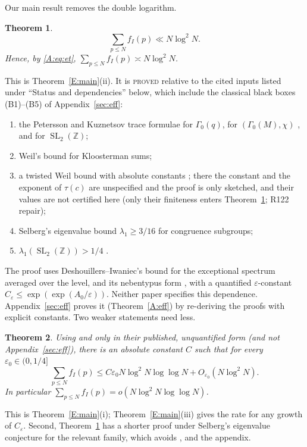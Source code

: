 \documentclass[10pt,reqno]{amsart}
\newtheorem{introthm}{Theorem}
\theoremstyle{definition}
\numberwithin{equation}{section}
\newcommand{\Z}{\mathbb Z}
\DeclareMathOperator{\SL}{SL}
\newcommand{\status}[1]{\textup{\textsc{#1}}}
\begin{document}
Our main result removes the double logarithm.
\begin{introthm}\label{thm:main}
\[
 \sum_{p\le N}f_I(p)\ll N\log^2N .
\]
Hence, by \eqref{A:eq:et}, $\sum_{p\le N}f_I(p)\asymp N\log^2N$.
\end{introthm}
This is Theorem~\ref{E:main}(ii). It is \status{proved} relative to the
cited inputs listed under ``Status and dependencies'' below, which include the
classical black boxes (B1)--(B5) of Appendix~\ref{sec:eff}:
\begin{enumerate}
\item[(B1)] the Petersson and Kuznetsov trace formulae for $\Gamma_0(q)$, for
$(\Gamma_0(M),\chi)$ \cite[Lemma~4.5]{Dr}, and for $\SL_2(\Z)$;
\item[(B2)] Weil's bound for Kloosterman sums;
\item[(B3)] a twisted Weil bound with absolute constants \cite[Lemma~4.2]{Dr}; there the
constant and the exponent of $\tau(c)$ are unspecified and the proof is only
sketched, and their values are not certified here (only their finiteness
enters Theorem~\ref{thm:main}; R122 repair);
\item[(B4)] Selberg's eigenvalue bound $\lambda_1\ge3/16$ for congruence subgroups;
\item[(B5)] $\lambda_1(\SL_2(\Z))>1/4$ \cite[Theorem~3]{DI}.
\end{enumerate}
The proof uses Deshouillers--Iwaniec's bound \cite[Theorem~7]{DI} for the
exceptional spectrum averaged over the level, and its nebentypus form
\cite[Lemma~4.10]{Dr}, with a quantified $\varepsilon$-constant
$C_\varepsilon\le\exp(\exp(A_0/\varepsilon))$. Neither paper specifies this dependence. Appendix~\ref{sec:eff}
proves it (Theorem~\ref{A:eff}) by re-deriving the proofs with explicit constants.
Two weaker statements need less.
\begin{introthm}\label{thm:uncond}
Using \cite[Theorem~7]{DI} and \cite[Lemma~4.10]{Dr} only in their published,
unquantified form \textup(and not Appendix~\ref{sec:eff}\textup), there is an
absolute constant $C$ such that for every $\varepsilon_0\in(0,1/4]$
\[
 \sum_{p\le N}f_I(p)\le C\varepsilon_0N\log^2N\log\log N+O_{\varepsilon_0}(N\log^2N).
\]
In particular $\sum_{p\le N}f_I(p)=o(N\log^2N\log\log N)$.
\end{introthm}
This is Theorem~\ref{E:main}(i); Theorem~\ref{E:main}(iii) gives the rate for
any growth of $C_\varepsilon$. Second, Theorem~\ref{thm:main} has a shorter
proof under Selberg's eigenvalue conjecture for the relevant family, which
avoids \cite[Theorem~7]{DI}, \cite[Lemma~4.10]{Dr} and the appendix.
\end{document}
